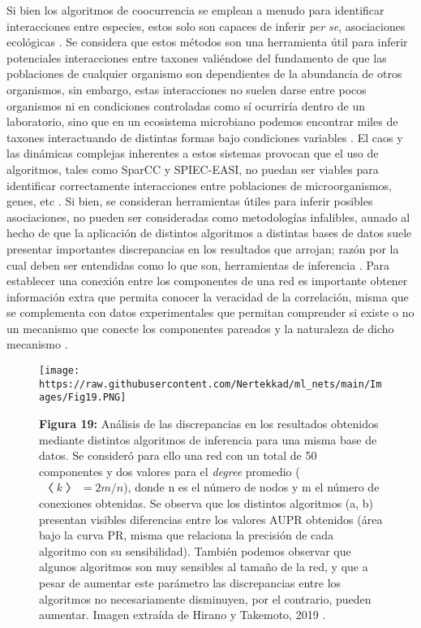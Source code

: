 \documentclass[
]{book}
\begin{document}
Si bien los algoritmos de coocurrencia se emplean a menudo para identificar interacciones entre especies, estos solo son capaces de inferir \emph{per se}, asociaciones ecológicas \citep{kurtz2015sparse}. Se considera que estos métodos son una herramienta útil para inferir potenciales interacciones entre taxones valiéndose del fundamento de que las poblaciones de cualquier organismo son dependientes de la abundancia de otros organismos, sin embargo, estas interacciones no suelen darse entre pocos organismos ni en condiciones controladas como sí ocurriría dentro de un laboratorio, sino que en un ecosistema microbiano podemos encontrar miles de taxones interactuando de distintas formas bajo condiciones variables \citep{hirano2019difficulty}. El caos y las dinámicas complejas inherentes a estos sistemas provocan que el uso de algoritmos, tales como SparCC y SPIEC-EASI, no puedan ser viables para identificar correctamente interacciones entre poblaciones de microorganismos, genes, etc \citep{kurtz2015sparse}. Si bien, se consideran herramientas útiles para inferir posibles asociaciones, no pueden ser consideradas como metodologías infalibles, aunado al hecho de que la aplicación de distintos algoritmos a distintas bases de datos suele presentar importantes discrepancias en los resultados que arrojan; razón por la cual deben ser entendidas como lo que son, herramientas de inferencia \citep{layeghifard2018constructing}. Para establecer una conexión entre los componentes de una red es importante obtener información extra que permita conocer la veracidad de la correlación, misma que se complementa con datos experimentales que permitan comprender si existe o no un mecanismo que conecte los componentes pareados y la naturaleza de dicho mecanismo \citep{hirano2019difficulty}.

\begin{figure}
\centering
\texttt{[image: https://raw.githubusercontent.com/Nertekkad/ml\_nets/main/Images/Fig19.PNG]}
\caption{\textbf{Figura 19:} Análisis de las discrepancias en los resultados obtenidos mediante distintos algoritmos de inferencia para una misma base de datos. Se consideró para ello una red con un total de 50 componentes y dos valores para el \emph{degree} promedio (\(〈k〉= 2m/n\)), donde n es el número de nodos y m el número de conexiones obtenidas. Se observa que los distintos algoritmos (a, b) presentan visibles diferencias entre los valores AUPR obtenidos (área bajo la curva PR, misma que relaciona la precisión de cada algoritmo con su sensibilidad). También podemos observar que algunos algoritmos son muy sensibles al tamaño de la red, y que a pesar de aumentar este parámetro las discrepancias entre los algoritmos no necesariamente disminuyen, por el contrario, pueden aumentar. Imagen extraída de Hirano y Takemoto, 2019 \citep{hirano2019difficulty}.}
\end{figure}
\end{document}
